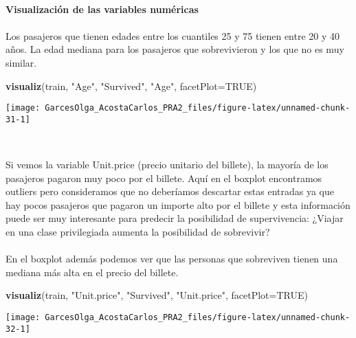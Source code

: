 \documentclass[
]{article}
\newenvironment{Shaded}{\begin{snugshade}}{\end{snugshade}}
\newcommand{\DataTypeTok}[1]{\textcolor[rgb]{0.13,0.29,0.53}{#1}}
\newcommand{\KeywordTok}[1]{\textcolor[rgb]{0.13,0.29,0.53}{\textbf{#1}}}
\newcommand{\NormalTok}[1]{#1}
\newcommand{\OtherTok}[1]{\textcolor[rgb]{0.56,0.35,0.01}{#1}}
\newcommand{\StringTok}[1]{\textcolor[rgb]{0.31,0.60,0.02}{#1}}
\begin{document}
\texttt{}~\\
\texttt{}

\textbf{Visualización de las variables numéricas}\\
\texttt{}~\\
Los pasajeros que tienen edades entre los cuantiles 25 y 75 tienen entre
20 y 40 años. La edad mediana para los pasajeros que sobrevivieron y los
que no es muy similar.\\
\texttt{}

\begin{Shaded}
\begin{Highlighting}[]
\KeywordTok{visualiz}\NormalTok{(train, }\StringTok{"Age"}\NormalTok{, }\StringTok{"Survived"}\NormalTok{, }\StringTok{"Age"}\NormalTok{, }\DataTypeTok{facetPlot=}\OtherTok{TRUE}\NormalTok{)}
\end{Highlighting}
\end{Shaded}

\begin{center}\texttt{[image: GarcesOlga\_AcostaCarlos\_PRA2\_files/figure-latex/unnamed-chunk-31-1]} \end{center}

\texttt{}~\\
\texttt{}

Si vemos la variable Unit.price (precio unitario del billete), la
mayoría de los pasajeros pagaron muy poco por el billete. Aquí en el
boxplot encontramos outliers pero consideramos que no deberíamos
descartar estas entradas ya que hay pocos pasajeros que pagaron un
importe alto por el billete y esta información puede ser muy interesante
para predecir la posibilidad de supervivencia: ¿Viajar en una clase
privilegiada aumenta la posibilidad de sobrevivir?\\
\texttt{}~\\
En el boxplot además podemos ver que las personas que sobreviven tienen
una mediana más alta en el precio del billete. \texttt{}

\begin{Shaded}
\begin{Highlighting}[]
\KeywordTok{visualiz}\NormalTok{(train, }\StringTok{"Unit.price"}\NormalTok{, }\StringTok{"Survived"}\NormalTok{, }\StringTok{"Unit.price"}\NormalTok{, }\DataTypeTok{facetPlot=}\OtherTok{TRUE}\NormalTok{)}
\end{Highlighting}
\end{Shaded}

\begin{center}\texttt{[image: GarcesOlga\_AcostaCarlos\_PRA2\_files/figure-latex/unnamed-chunk-32-1]} \end{center}
\end{document}
